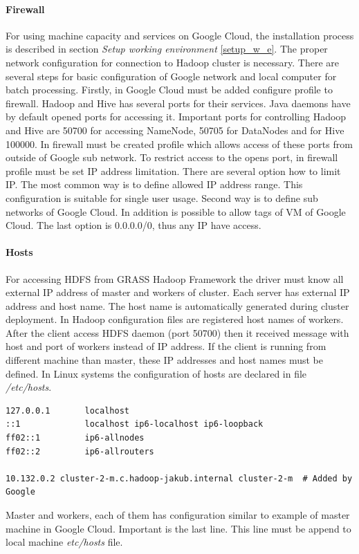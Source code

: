 \documentclass[a4paper,12pt,oneside]{report}
\begin{document}
	\paragraph{Firewall} For using machine capacity and services on Google Cloud, 
	the installation process is described in section \textit{Setup working
		environment} \ref{setup_w_e}. The proper network configuration for connection to
	Hadoop cluster is necessary. There are several steps for basic configuration of
	Google network and local computer for batch processing. Firstly, in Google Cloud
	must be added configure profile to firewall. Hadoop and Hive has several ports
	for their services. Java daemons have by default opened ports for accessing it.
	Important ports for controlling Hadoop and Hive are 50700 for accessing NameNode, 50705 for DataNodes
	and for Hive 100000. In firewall must be created profile which allows access of
	these ports from outside of Google sub net\-work. To restrict access to the opens port,
	in firewall profile must be set IP address limitation. There are several option
	how to limit IP. The most common way is to define allowed IP address range. This
	configuration is suitable for single user usage. Second way is to define sub
	networks of Google Cloud. In addition is possible to allow tags of VM of Google
	Cloud. The last option is  0.0.0.0/0, thus any IP have access.
	
	\paragraph{Hosts}\label{hosts} For accessing HDFS from GRASS Hadoop Framework the driver must
	know all external IP address of master and workers of cluster. Each server has
	external IP address and host name. The host name is automatically generated
	during cluster deployment. In Hadoop configuration files are registered host
	names of workers. After the client access HDFS daemon (port 50700) then it received
	message with host and port of workers instead of IP address. If the client is
	running from different machine than master, these IP addresses and host names
	must be defined. In Linux systems the configuration of hosts  are declared in
	file \textit{/etc/hosts}. 
	\begin{footnotesize}
		\begin{lstlisting}[style=python]
127.0.0.1       localhost
::1             localhost ip6-localhost ip6-loopback
ff02::1         ip6-allnodes
ff02::2         ip6-allrouters

10.132.0.2 cluster-2-m.c.hadoop-jakub.internal cluster-2-m  # Added by Google
		\end{lstlisting}
	\end{footnotesize}
	Master and workers, each of them has configuration similar to example of master
	machine in Google Cloud. Important is the  last line. This line must be append to local
	machine \textit{etc/hosts} file.	
	
\end{document}
